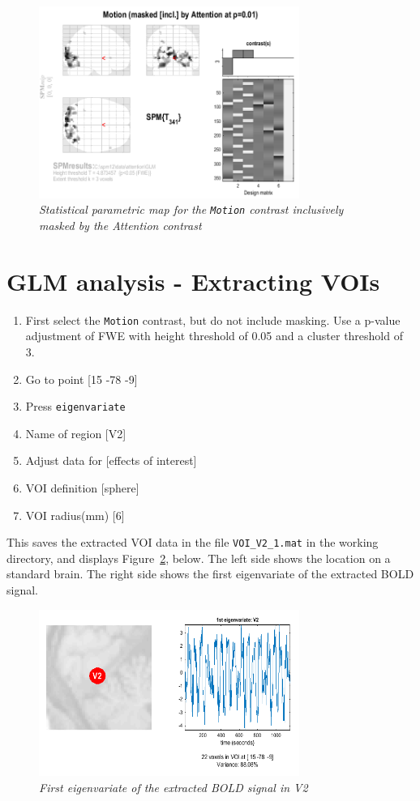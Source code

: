\begin{enumerate}
\begin{figure}[!ht]
\centering\includegraphics[width=85mm]{ppi/figures/Fig9.png}
\caption{\em Statistical parametric map for the \texttt{Motion} contrast inclusively masked by the Attention contrast}
\label{fig:ppi9}
\end{figure}
\end{enumerate}

\section{GLM analysis - Extracting VOIs}

\begin{enumerate}
\item First select the \texttt{Motion} contrast, but do not include masking. Use a p-value adjustment of FWE with height threshold of 0.05 and a cluster threshold of 3.
\item Go to point [15 -78 -9]
\item Press \texttt{eigenvariate}
\item Name of region [V2]
\item Adjust data for [effects of interest]
\item VOI definition [sphere]
\item VOI radius(mm) [6]
\end{enumerate}
This saves the extracted VOI data in the file \texttt{VOI\_V2\_1.mat} in the working directory, and displays Figure~\ref{fig:ppi10}, below. The left side shows the location on a standard brain. The right side shows the first eigenvariate of the extracted BOLD signal. 

\begin{figure}[!ht]
\centering\includegraphics[width=85mm]{ppi/figures/Fig10.png}
\caption{\em First eigenvariate of the extracted BOLD signal in V2}
\label{fig:ppi10}
\end{figure}

